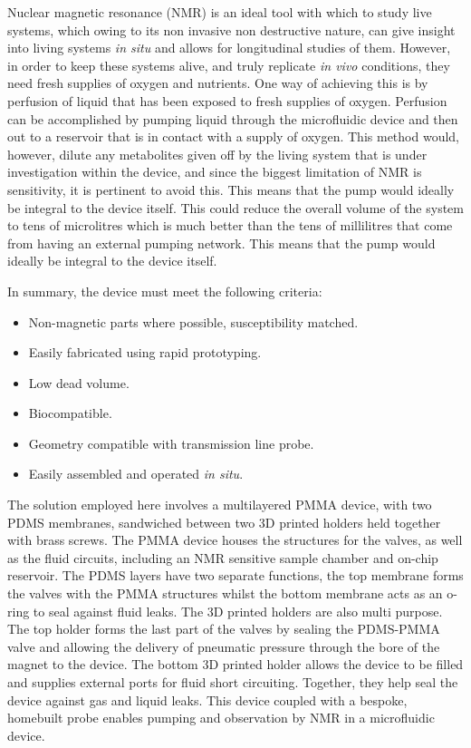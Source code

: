 Nuclear magnetic resonance (NMR) is an ideal tool with which to study live systems,
which owing to its non invasive non destructive nature, can give insight into living
systems \textit{in situ} and allows for longitudinal studies of them. However, in order to
keep these systems alive, and truly replicate \textit{in vivo} conditions, they need fresh supplies of oxygen and nutrients. One way of achieving this is by perfusion of
liquid that has been exposed to fresh supplies of oxygen. Perfusion can be accomplished by
pumping liquid through the microfluidic device and then out to a reservoir that is in
contact with a supply of oxygen. This method would, however, dilute any metabolites
given off by the living system that is under investigation within the device, and
since the biggest limitation of NMR is sensitivity, it is pertinent to avoid this. This
means that the pump would ideally be integral to the device itself. This could reduce the
overall volume of the system to tens of microlitres which is much better than the tens of
millilitres that come from having an external pumping network. This means that the pump
would ideally be integral to the device itself.

In summary, the device must meet the following criteria:
\begin{itemize}
  \item Non-magnetic parts where possible, susceptibility matched.
  \item Easily fabricated using rapid prototyping.
  \item Low dead volume.
  \item Biocompatible.
  \item Geometry compatible with transmission line probe.
  \item Easily assembled and operated \textit{in situ}.
\end{itemize}

The solution employed here involves a multilayered PMMA device,
with two PDMS membranes, sandwiched between two 3D printed holders held together with brass
screws. The PMMA device houses the structures for the valves, as well as the fluid circuits,
including an NMR sensitive sample chamber and on-chip reservoir. The PDMS layers have two
separate functions, the top membrane forms the valves with the PMMA structures whilst the
bottom membrane acts as an o-ring to seal against fluid leaks. The 3D printed holders
are also multi purpose. The top holder forms the last part of the valves by sealing the
PDMS-PMMA valve and allowing the delivery of pneumatic pressure through the bore of the
magnet to the device. The bottom 3D printed holder allows the device to be filled and
supplies external ports for fluid short circuiting. Together, they help seal the device
against gas and liquid leaks. This device coupled with a bespoke, homebuilt probe enables
pumping and observation by NMR in a microfluidic device.

